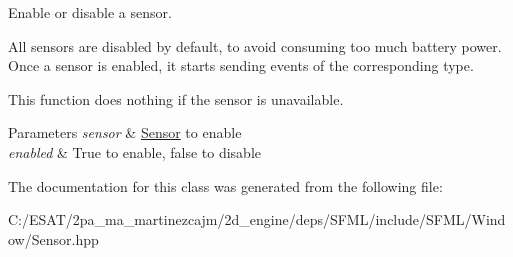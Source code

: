 Enable or disable a sensor. 

All sensors are disabled by default, to avoid consuming too much battery power. Once a sensor is enabled, it starts sending events of the corresponding type.

This function does nothing if the sensor is unavailable.


\begin{DoxyParams}{Parameters}
{\em sensor} & \hyperlink{classsf_1_1_sensor}{Sensor} to enable \\
\hline
{\em enabled} & True to enable, false to disable \\
\hline
\end{DoxyParams}


The documentation for this class was generated from the following file\+:\begin{DoxyCompactItemize}
\item 
C\+:/\+E\+S\+A\+T/2pa\+\_\+ma\+\_\+martinezcajm/2d\+\_\+engine/deps/\+S\+F\+M\+L/include/\+S\+F\+M\+L/\+Window/Sensor.\+hpp\end{DoxyCompactItemize}
